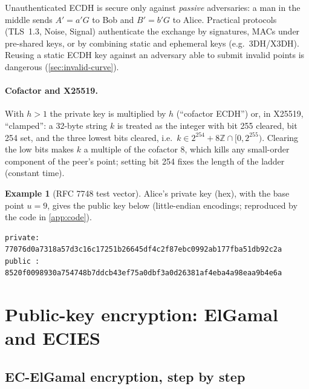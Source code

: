 \documentclass[11pt,a4paper,oneside]{book}
\theoremstyle{plain}
\theoremstyle{definition}
\newtheorem{example}[theorem]{Example}
\theoremstyle{remark}
\newcommand{\Z}{\mathbb{Z}}
\newcommand{\ELsection}{\subsection}
\begin{document}
\begin{warningbox}
Unauthenticated ECDH is secure only against \emph{passive} adversaries: a man in the middle sends $A'=a'G$ to Bob and $B'=b'G$ to Alice. Practical protocols (TLS~1.3, Noise, Signal) authenticate the exchange by signatures, MACs under pre-shared keys, or by combining static and ephemeral keys (e.g.\ 3DH/X3DH). Reusing a static ECDH key against an adversary able to submit invalid points is dangerous (\cref{sec:invalid-curve}).
\end{warningbox}

\paragraph{Cofactor and X25519.} With $h>1$ the private key is multiplied by $h$ (``cofactor ECDH'') or, in X25519, ``clamped'': a 32-byte string $k$ is treated as the integer with bit 255 cleared, bit 254 set, and the three lowest bits cleared, i.e.\ $k\in 2^{254}+8\Z\cap[0,2^{255})$. Clearing the low bits makes $k$ a multiple of the cofactor $8$, which kills any small-order component of the peer's point; setting bit 254 fixes the length of the ladder (constant time). 

\begin{example}[RFC 7748 test vector]
Alice's private key (hex), with the base point $u=9$, gives the public key below (little-endian encodings; reproduced by the code in \cref{app:code}).
\begin{lstlisting}[style=plain]
private: 77076d0a7318a57d3c16c17251b26645df4c2f87ebc0992ab177fba51db92c2a
public : 8520f0098930a754748b7ddcb43ef75a0dbf3a0d26381af4eba4a98eaa9b4e6a
\end{lstlisting}
\end{example}

\section{Public-key encryption: ElGamal and ECIES}

\ELsection{EC-ElGamal encryption, step by step}\label{sec:ecelgamal}
\end{document}
